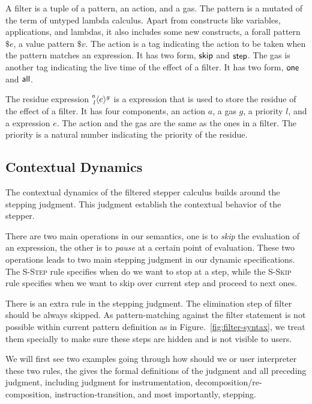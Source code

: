 A filter is a tuple of a pattern, an action, and a gas. The pattern
is a mutated of the term of untyped lambda calculus. Apart from constructs like
variables, applications, and lambdas, it also includes some new constructs, a
forall pattern \(\$e\), a value pattern \(\$v\). The action is a tag indicating
the action to be taken when the pattern matches an expression. It has two
form, \(\ActSkip\) and \(\ActStep\). The gas is another tag indicating the
live time of the effect of a filter. It has two form, \(\GasOne\) and
\(\GasAll\).

The residue expression \(\Residue{a}{g}{l}{e}\) is a expression that is used to
store the residue of the effect of a filter. It has four components, an action
\(a\), a gas \(g\), a priority \(l\), and a expression \(e\). The action and the
gas are the same as the ones in a filter. The priority is a natural number
indicating the priority of the residue.

\subsection{Contextual Dynamics}

The contextual dynamics of the filtered stepper calculus builds around the stepping judgment. This judgment establish the contextual behavior of the stepper.

There are two main operations in our semantics, one is to \emph{skip} the
evaluation of an expression, the other is to \emph{pause} at a certain point of
evaluation. These two operations leads to two main stepping judgment in our
dynamic specifications. The \textsc{S-Step} rule specifies when do we want to
stop at a step, while the \textsc{S-Skip} rule specifies when we want to skip over
current step and proceed to next ones.

There is an extra rule in the stepping judgment. The elimination step of filter
should be always skipped. As pattern-matching against the filter statement is
not possible within current pattern definition as in
Figure.~\ref{fig:filter-syntax}, we treat them specially to make sure these
steps are hidden and is not visible to users.

We will first see two examples going through how should we or user interpreter these two rules, the gives the formal definitions of the judgment and all preceding judgment, including judgment for instrumentation, decomposition/re-composition, instruction-transition, and most importantly, stepping.


